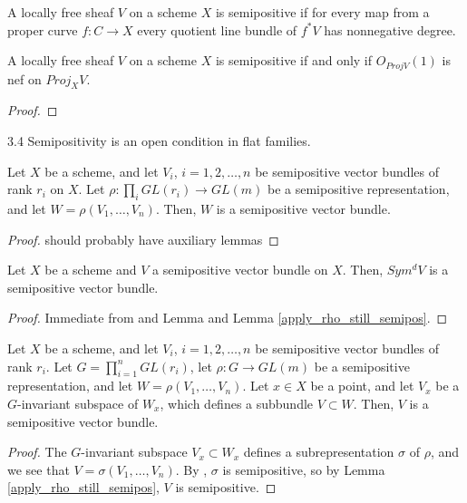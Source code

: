 \begin{definition}
A locally free sheaf $V$ on a scheme $X$ is semipositive if for every map from a proper curve $f:C\to X$ every quotient line bundle of $f^*V$ has nonnegative degree.
\end{definition}

\begin{lemma}
A locally free sheaf $V$ on a scheme $X$ is semipositive if and only if $O_{Proj V}(1)$ is nef on $Proj_XV$.
\end{lemma}
\begin{proof}

\end{proof}

\begin{lemma}
3.4 Semipositivity is an open condition in flat families.
\end{lemma}

\begin{lemma}\label{apply_rho_still_semipos}
Let $X$ be a scheme, and let $V_i$, $i=1,2,\ldots,n$ be semipositive vector bundles of rank $r_i$ on $X$. Let $\rho:\prod_i GL(r_i)\to GL(m)$ be a semipositive representation, and let $W=\rho(V_1,\ldots,V_n)$. Then, $W$ is a semipositive vector bundle.
\end{lemma}

\begin{proof}
should probably have auxiliary lemmas
\end{proof}

\begin{lemma}
Let $X$ be a scheme and $V$ a semipositive vector bundle on $X$. Then, $Sym^dV$ is a semipositive vector bundle.
\end{lemma}

\begin{proof}
Immediate from and Lemma  and Lemma \ref{apply_rho_still_semipos}.
\end{proof}

\begin{lemma}
Let $X$ be a scheme, and let $V_i$, $i=1,2,\ldots,n$ be semipositive vector bundles of rank $r_i$. Let $G=\prod_{i=1}^{n}GL(r_i)$, let $\rho:G\to GL(m)$ be a semipositive representation, and let $W=\rho(V_1,\ldots,V_n)$. Let $x\in X$ be a point, and let $V_x$ be a $G$-invariant subspace of $W_x$, which defines a subbundle $V\subset W$. Then, $V$ is a semipositive vector bundle.
\end{lemma}

\begin{proof}
The $G$-invariant subspace $V_x\subset W_x$ defines a subrepresentation $\sigma$ of $\rho$, and we see that $V=\sigma(V_1,\ldots,V_n)$. By , $\sigma$ is semipositive, so by Lemma \ref{apply_rho_still_semipos}, $V$ is semipositive.
\end{proof}







